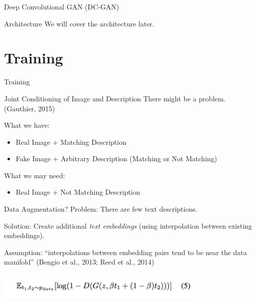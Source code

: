\documentclass{beamer}
\begin{document}
\begin{frame}{Deep Convolutional GAN (DC-GAN)}
\begin{block}{Architecture}
We will cover the architecture later.
\end{block}
\end{frame}


\section{Training}
\begin{frame}{}
\centering
Training
\end{frame}


\begin{frame}{Joint Conditioning of Image and Description}
There might be a problem. (Gauthier, 2015)
\vskip 0.5cm

What we have:
\begin{itemize}
\item Real Image + Matching Description
\item Fake Image + Arbitrary Description (Matching or Not Matching)
\end{itemize}
\vskip 0.5cm

What we may need:
\begin{itemize}
\item Real Image + Not Matching Description
\end{itemize}
\end{frame}


\begin{frame}{Data Augmentation?}
Problem: There are few text descriptions.
\vskip 0.5cm

Solution: Create additional \textit{text embeddings} (using interpolation between existing embeddings).
\vskip 0.5cm

Assumption: ``interpolations between embedding pairs tend to be near the data manifold'' (Bengio et al., 2013; Reed et al., 2014)
\vskip 0.5cm

\centering
\includegraphics[width=10cm]{img/reed/interpolation.png}

\end{frame}
\end{document}
